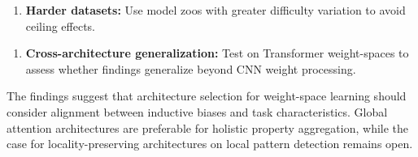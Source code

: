 \begin{enumerate}
\item \textbf{Harder datasets:} Use model zoos with greater difficulty variation to avoid ceiling effects.
\end{enumerate}

\begin{enumerate}
\item \textbf{Cross-architecture generalization:} Test on Transformer weight-spaces to assess whether findings generalize beyond CNN weight processing.
\end{enumerate}

The findings suggest that architecture selection for weight-space learning should consider alignment between inductive biases and task characteristics. Global attention architectures are preferable for holistic property aggregation, while the case for locality-preserving architectures on local pattern detection remains open.
